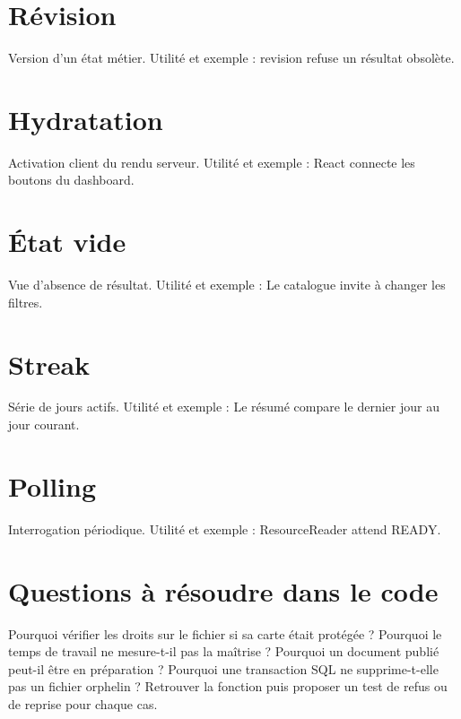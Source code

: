 \section*{Révision}
Version d’un état métier. Utilité et exemple : revision refuse un résultat obsolète.

\section*{Hydratation}
Activation client du rendu serveur. Utilité et exemple : React connecte les boutons du dashboard.

\section*{État vide}
Vue d’absence de résultat. Utilité et exemple : Le catalogue invite à changer les filtres.

\section*{Streak}
Série de jours actifs. Utilité et exemple : Le résumé compare le dernier jour au jour courant.

\section*{Polling}
Interrogation périodique. Utilité et exemple : ResourceReader attend READY.

\section{Questions à résoudre dans le code}
Pourquoi vérifier les droits sur le fichier si sa carte était protégée ? Pourquoi le temps de travail ne mesure-t-il pas la maîtrise ? Pourquoi un document publié peut-il être en préparation ? Pourquoi une transaction SQL ne supprime-t-elle pas un fichier orphelin ? Retrouver la fonction puis proposer un test de refus ou de reprise pour chaque cas.
